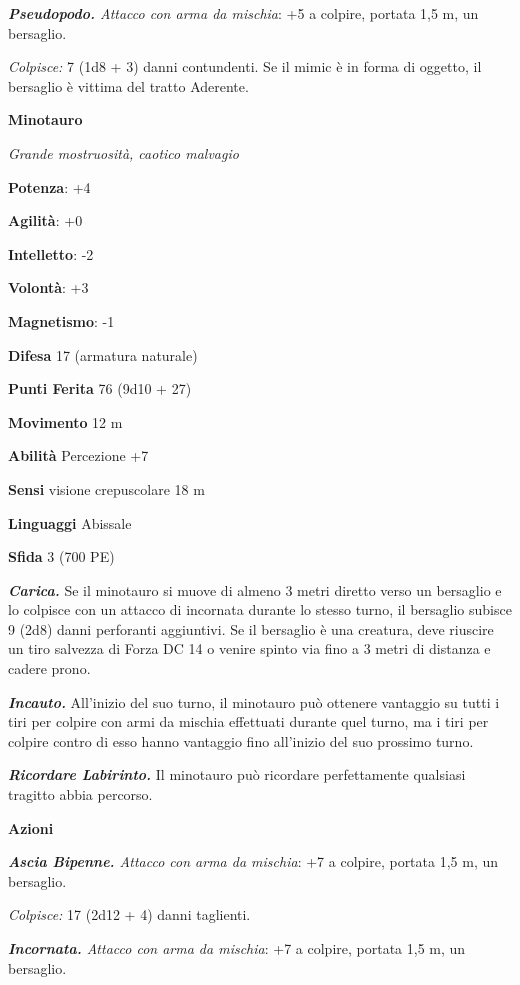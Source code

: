 \begin{multicols}{2}
\emph{\textbf{Pseudopodo.} Attacco con arma da mischia}: +5 a colpire,
portata 1,5 m, un bersaglio.

\emph{Colpisce:} 7 (1d8 + 3) danni contundenti. Se il mimic è in forma
di oggetto, il bersaglio è vittima del tratto Aderente.



\textbf{Minotauro}

\emph{Grande mostruosità, caotico malvagio}

\textbf{Potenza}: +4

\textbf{Agilità}: +0

\textbf{Intelletto}: -2

\textbf{Volontà}: +3

\textbf{Magnetismo}: -1

\textbf{Difesa} 17 (armatura naturale)

\textbf{Punti Ferita} 76 (9d10 + 27)

\textbf{Movimento} 12 m

\textbf{Abilità} Percezione +7

\textbf{Sensi} visione crepuscolare 18 m

\textbf{Linguaggi} Abissale

\textbf{Sfida} 3 (700 PE)

\emph{\textbf{Carica.}} Se il minotauro si muove di almeno 3 metri
diretto verso un bersaglio e lo colpisce con un attacco di incornata
durante lo stesso turno, il bersaglio subisce 9 (2d8) danni perforanti
aggiuntivi. Se il bersaglio è una creatura, deve riuscire un tiro
salvezza di Forza DC 14 o venire spinto via fino a 3 metri di distanza e
cadere prono.

\emph{\textbf{Incauto.}} All'inizio del suo turno, il minotauro può
ottenere vantaggio su tutti i tiri per colpire con armi da mischia
effettuati durante quel turno, ma i tiri per colpire contro di esso
hanno vantaggio fino all'inizio del suo prossimo turno.

\emph{\textbf{Ricordare Labirinto.}} Il minotauro può ricordare
perfettamente qualsiasi tragitto abbia percorso.

\textbf{Azioni}

\emph{\textbf{Ascia Bipenne.} Attacco con arma da mischia}: +7 a
colpire, portata 1,5 m, un bersaglio.

\emph{Colpisce:} 17 (2d12 + 4) danni taglienti.

\emph{\textbf{Incornata.} Attacco con arma da mischia}: +7 a colpire,
portata 1,5 m, un bersaglio.


\end{multicols}

